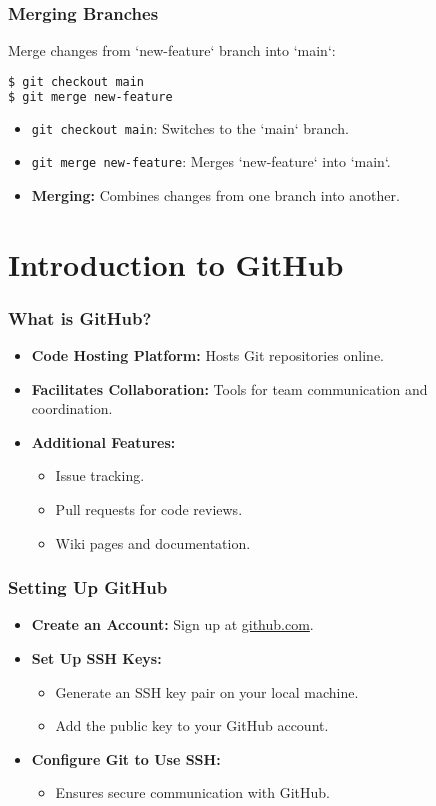 \begin{frame}[fragile]
  \frametitle{Merging Branches}
  Merge changes from `new-feature` branch into `main`:
  \begin{lstlisting}[language=bash]
$ git checkout main
$ git merge new-feature
  \end{lstlisting}
  \begin{itemize}
    \item \texttt{git checkout main}: Switches to the `main` branch.
    \item \texttt{git merge new-feature}: Merges `new-feature` into `main`.
    \item \textbf{Merging:} Combines changes from one branch into another.
  \end{itemize}
\end{frame}

\section{Introduction to GitHub}

\begin{frame}
  \frametitle{What is GitHub?}
  \begin{itemize}
    \item \textbf{Code Hosting Platform:} Hosts Git repositories online.
    \item \textbf{Facilitates Collaboration:} Tools for team communication and coordination.
    \item \textbf{Additional Features:}
      \begin{itemize}
        \item Issue tracking.
        \item Pull requests for code reviews.
        \item Wiki pages and documentation.
      \end{itemize}
  \end{itemize}
\end{frame}

\begin{frame}
  \frametitle{Setting Up GitHub}
  \begin{itemize}
    \item \textbf{Create an Account:} Sign up at \href{https://github.com}{github.com}.
    \item \textbf{Set Up SSH Keys:}
      \begin{itemize}
        \item Generate an SSH key pair on your local machine.
        \item Add the public key to your GitHub account.
      \end{itemize}
    \item \textbf{Configure Git to Use SSH:}
      \begin{itemize}
        \item Ensures secure communication with GitHub.
      \end{itemize}
  \end{itemize}
\end{frame}

